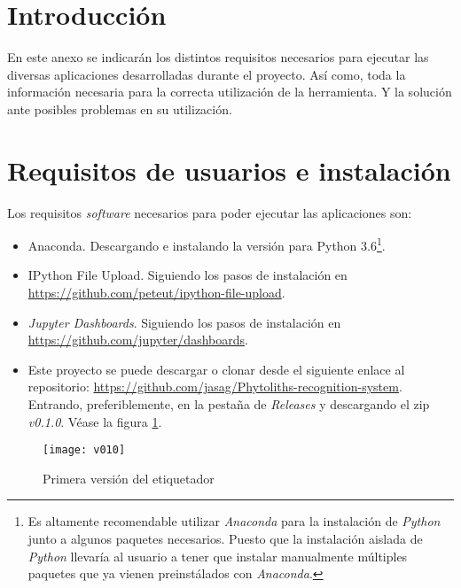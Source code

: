 
\section{Introducción}

En este anexo se indicarán los distintos requisitos necesarios para ejecutar las diversas aplicaciones desarrolladas durante el proyecto. Así como, toda la información necesaria para la correcta utilización de la herramienta. Y la solución ante posibles problemas en su utilización.

\section{Requisitos de usuarios e instalación}

Los requisitos \textit{software} necesarios para poder ejecutar las aplicaciones son:

\begin{itemize}
	\item Anaconda. Descargando e instalando la versión para Python 3.6\footnote{Es altamente recomendable utilizar \textit{Anaconda} para la instalación de \textit{Python} junto a algunos paquetes necesarios. Puesto que la instalación aislada de \textit{Python} llevaría al usuario a tener que instalar manualmente múltiples paquetes que ya vienen preinstálados con \textit{Anaconda}.}.

	\item IPython File Upload. Siguiendo los pasos de instalación en \url{https://github.com/peteut/ipython-file-upload}.

	\item \textit{Jupyter Dashboards}. Siguiendo los pasos de instalación en \url{https://github.com/jupyter/dashboards}.

	\item Este proyecto se puede descargar o clonar desde el siguiente enlace al repositorio: \url{https://github.com/jasag/Phytoliths-recognition-system}. Entrando, preferiblemente, en la pestaña de \textit{Releases} y descargando el zip \textit{v0.1.0}. Véase la figura \ref{fig:E.4.0}.

\end{itemize}

\begin{figure}[h]
\centering
\texttt{[image: v010]}
\caption{Primera versión del etiquetador}
\label{fig:E.4.0}
\end{figure}

